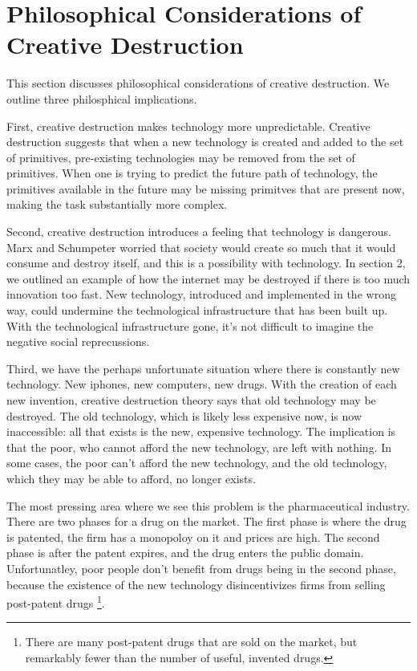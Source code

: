 \documentclass[11pt]{article}
\begin{document}
\section{Philosophical Considerations of Creative Destruction}
This section discusses philosophical considerations of creative destruction.
We outline three philosphical implications.

First, creative destruction makes technology more unpredictable.
Creative destruction suggests that when a new technology is created and added to the set of primitives, pre-existing technologies may be removed from the set of primitives.
When one is trying to predict the future path of technology, the primitives available in the future may be missing primitves that are present now, making the task substantially more complex.

Second, creative destruction introduces a feeling that technology is dangerous.
Marx and Schumpeter worried that society would create so much that it would consume and destroy itself, and this is a possibility with technology.
In section 2, we outlined an example of how the internet may be destroyed if there is too much innovation too fast.
New technology, introduced and implemented in the wrong way, could undermine the technological infrastructure that has been built up. 
With the technological infrastructure gone, it's not difficult to imagine the negative social reprecussions.

Third, we have the perhaps unfortunate situation where there is constantly new technology.
New iphones, new computers, new drugs.
With the creation of each new invention, creative destruction theory says that old technology may be destroyed.
The old technology, which is likely less expensive now, is now inaccessible: all that exists is the new, expensive technology.
The implication is that the poor, who cannot afford the new technology, are left with nothing. 
In some cases, the poor can't afford the new technology, and the old technology, which they may be able to afford, no longer exists.

The most pressing area where we see this problem is the pharmaceutical industry.
There are two phases for a drug on the market. 
The first phase is where the drug is patented, the firm has a monopoloy on it and prices are high.
The second phase is after the patent expires, and the drug enters the public domain. 
Unfortunatley, poor people don't benefit from drugs being in the second phase, because the existence of the new technology disincentivizes firms from selling post-patent drugs \footnote{There are many post-patent drugs that are sold on the market, but remarkably fewer than the number of useful, invented drugs.}.
\end{document}
